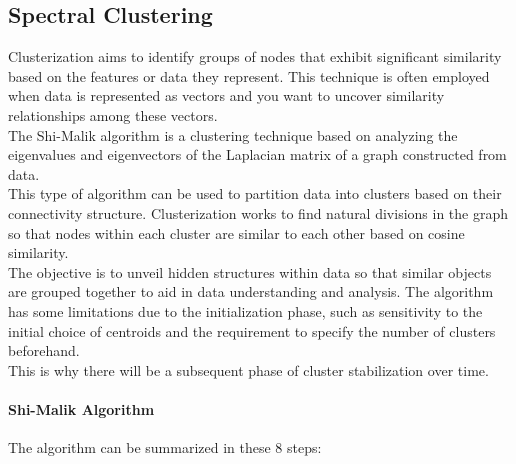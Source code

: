 \subsection{Spectral Clustering}
\label{sec:spectral_clustering}
Clusterization aims to identify groups of nodes that exhibit significant similarity based on the features or data they represent.
This technique is often employed when data is represented as vectors and you want to uncover similarity relationships among these vectors.\\
The Shi-Malik algorithm is a clustering technique based on analyzing the eigenvalues and eigenvectors of the Laplacian matrix of a graph constructed from data.\\
This type of algorithm can be used to partition data into clusters based on their connectivity structure.
Clusterization works to find natural divisions in the graph so that nodes within each cluster are similar to each other based on cosine similarity. \\
The objective is to unveil hidden structures within data so that similar objects are grouped together to aid in data understanding and analysis.
The algorithm has some limitations due to the initialization phase, such as sensitivity to the initial choice of centroids and the requirement to specify the number of clusters beforehand.\\
This is why there will be a subsequent phase of cluster stabilization over time.

\paragraph{Shi-Malik Algorithm} The algorithm can be summarized in these 8 steps:

